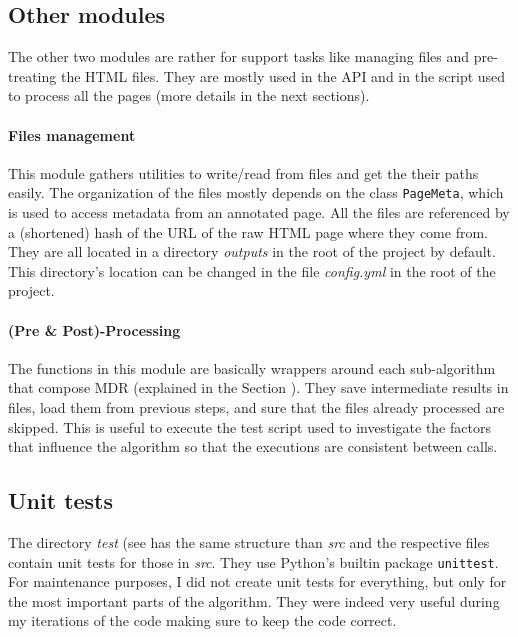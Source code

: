 \documentclass[10pt]{article}
\newcommand{\code}[1]{\colorbox{codegray}{\texttt{#1}}}
\begin{document}
\subsection{Other modules}

The other two modules are rather for support tasks like managing files and pre-treating the HTML files. They are mostly used in the API and in the script used to process all the pages (more details in the next sections). 

\paragraph{Files management} 

This module gathers utilities to write/read from files and get the their paths easily. The organization of the files mostly depends on the class \code{PageMeta}, which is used to access metadata from an annotated page. All the files are referenced by a (shortened) hash of the URL of the raw HTML page where they come from. They are all located in a directory \emph{outputs} in the root of the project by default. This directory's location can be changed in the file \emph{config.yml} in the root of the project.

\paragraph{(Pre \& Post)-Processing}

The functions in this module are basically wrappers around each sub-algorithm that compose MDR (explained in the Section ). They save intermediate results in files, load them from previous steps, and sure that the files already processed are skipped. This is useful to execute the test script used to investigate the factors that influence the algorithm so that the executions are consistent between calls.



\subsection{Unit tests}

The directory \emph{test} (see has the same structure than \emph{src} and the respective files contain unit tests for those in \emph{src}. They use Python's builtin package \code{unittest}. For maintenance purposes, I did not create unit tests for everything, but only for the most important parts of the algorithm. They were indeed very useful during my iterations of the code making sure to keep the code correct. 
\end{document}
